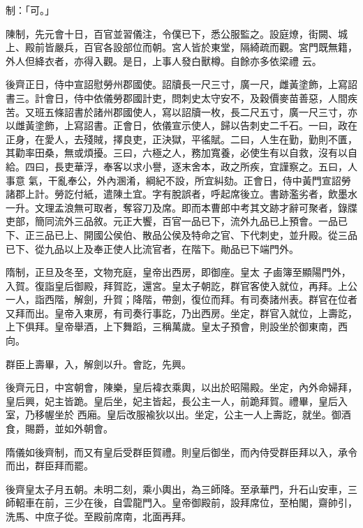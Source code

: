 \begin{pinyinscope}
 制：「可。」



 陳制，先元會十日，百官並習儀注，令僕已下，悉公服監之。設庭燎，街闕、城上、殿前皆嚴兵，百官各設部位而朝。宮人皆於東堂，隔綺疏而觀。宮門既無籍，外人但絳衣者，亦得入觀。是日，上事人發白獸樽。自餘亦多依梁禮
 云。



 後齊正日，侍中宣詔慰勞州郡國使。詔牘長一尺三寸，廣一尺，雌黃塗飾，上寫詔書三。計會日，侍中依儀勞郡國計吏，問刺史太守安不，及穀價麥苗善惡，人間疾苦。又班五條詔書於諸州郡國使人，寫以詔牘一枚，長二尺五寸，廣一尺三寸，亦以雌黃塗飾，上寫詔書。正會日，依儀宣示使人，歸以告刺史二千石。一曰，政在正身，在愛人，去殘賊，擇良吏，正決獄，平徭賦。二曰，人生在勤，勤則不匱，其勸率田桑，無或煩擾。三曰，六極之人，務加寬養，必使生有以自救，沒有以自給。四曰，長吏華浮，奉客以求小譽，逐末舍本，政之所疾，宜謹察之。五曰，人事意
 氣，干亂奉公，外內溷淆，綱紀不設，所宜糾劾。正會日，侍中黃門宣詔勞諸郡上計。勞訖付紙，遣陳土宜。字有脫誤者，呼起席後立。書跡濫劣者，飲墨水一升。文理孟浪無可取者，奪容刀及席。即而本曹郎中考其文跡才辭可聚者，錄牒吏部，簡同流外三品敘。元正大饗，百官一品已下，流外九品已上預會。一品已下、正三品已上、開國公侯伯、散品公侯及特命之官、下代刺史，並升殿。從三品已下、從九品以上及奉正使人比流官者，在階下。勛品已下端門外。



 隋制，正旦及冬至，文物充庭，皇帝出西房，即御座。皇太
 子鹵簿至顯陽門外，入賀。復詣皇后御殿，拜賀訖，還宮。皇太子朝訖，群官客使入就位，再拜。上公一人，詣西階，解劍，升賀；降階，帶劍，復位而拜。有司奏諸州表。群官在位者又拜而出。皇帝入東房，有司奏行事訖，乃出西房。坐定，群官入就位，上壽訖，上下俱拜。皇帝舉酒，上下舞蹈，三稱萬歲。皇太子預會，則設坐於御東南，西向。



 群臣上壽畢，入，解劍以升。會訖，先興。



 後齊元日，中宮朝會，陳樂，皇后褘衣乘輿，以出於昭陽殿。坐定，內外命婦拜，皇后興，妃主皆跪。皇后坐，妃主皆起，長公主一人，前跪拜賀。禮畢，皇后入室，乃移幄坐於
 西廂。皇后改服褕狄以出。坐定，公主一人上壽訖，就坐。御酒食，賜爵，並如外朝會。



 隋儀如後齊制，而又有皇后受群臣賀禮。則皇后御坐，而內侍受群臣拜以入，承令而出，群臣拜而罷。



 後齊皇太子月五朝。未明二刻，乘小輿出，為三師降。至承華門，升石山安車，三師軺車在前，三少在後，自雲龍門入。皇帝御殿前，設拜席位，至柏閣，齋帥引，洗馬、中庶子從。至殿前席南，北面再拜。




\end{pinyinscope}
